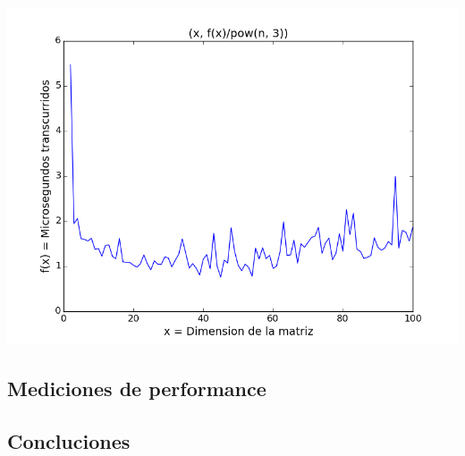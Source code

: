 \begin{center}
\includegraphics[scale=0.54]{images/4potenciasobrecubo}
\end{center}


\subsection{Mediciones de performance} \label{ej_3:performance}

\subsection{Concluciones} \label{ej_3:concluciones}

